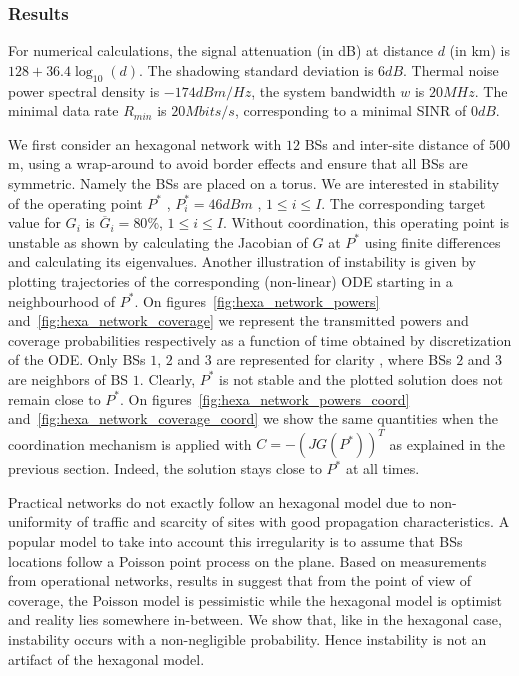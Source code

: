 \documentclass[10pt,conference,letterpaper]{IEEEtran}
\begin{document}
	\subsubsection{Results}
	For numerical calculations, the signal attenuation (in dB) at distance $d$ (in km) is $128 + 36.4 \log_{10}(d)$. The shadowing standard deviation is $6dB$. Thermal noise power spectral density is $-174dBm/Hz $, the system bandwidth $w$ is $20 MHz$. The minimal data rate $R_{min}$ is $20Mbits/s$, corresponding to a minimal \ac{SINR} of $0dB$. 
	
	We first consider an hexagonal network with $12$ \acp{BS} and inter-site distance of $500$ m, using a wrap-around to avoid border effects and ensure that all \acp{BS} are symmetric.  Namely the \acp{BS} are placed on a torus. We are interested in stability of the operating point $P^*$ , $P^*_i=46 dBm$ , $1 \leq i \leq I$. The corresponding target value for $G_i$ is $\overline{G}_i = 80\%$, $1 \leq i \leq I$. Without coordination, this operating point is unstable as shown by calculating the Jacobian of $G$ at $P^*$ using finite differences and calculating its eigenvalues. Another illustration of instability is given by plotting trajectories of the corresponding (non-linear) \ac{ODE} starting in a neighbourhood of $P^*$. On figures~\ref{fig:hexa_network_powers} and~\ref{fig:hexa_network_coverage} we represent the transmitted powers and coverage probabilities respectively as a function of time obtained by discretization of the \ac{ODE}. Only \acp{BS} $1$, $2$ and $3$ are represented for clarity , where \acp{BS} $2$ and $3$ are neighbors of \ac{BS} $1$. Clearly, $P^*$ is not stable and the plotted solution does not remain close to $P^*$. On figures~\ref{fig:hexa_network_powers_coord} and~\ref{fig:hexa_network_coverage_coord} we show the same quantities when the coordination mechanism is applied with $C = -(JG(P^*))^T$ as explained in the previous section. Indeed, the solution stays close to $P^*$ at all times. 

	Practical networks do not exactly follow an hexagonal model due to non-uniformity of traffic and scarcity of sites with good propagation characteristics. A popular model to take into account this irregularity is to assume that \acp{BS} locations follow a Poisson point process on the plane. Based on measurements from operational networks, results in \cite{AndrewsBaccelliGeometry} suggest that from the point of view of coverage, the Poisson model is pessimistic while the hexagonal model is optimist and reality lies somewhere in-between. We show that, like in the hexagonal case, instability occurs with a non-negligible probability. Hence instability is not an artifact of the hexagonal model. 
	
\end{document}
